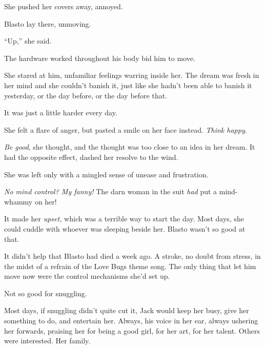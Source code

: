 She pushed her covers away, annoyed.



Blasto lay there, unmoving.



``Up,'' she said.



The hardware worked throughout his body bid him to move.



She stared at him, unfamiliar feelings warring inside her.  The dream was fresh in her mind and she couldn't banish it, just like she hadn't been able to banish it yesterday, or the day before, or the day before that.



It was just a little harder every day.



She felt a flare of anger, but pasted a smile on her face instead.  \emph{Think happy}.



\emph{Be good}, she thought, and the thought was too close to an idea in her dream.  It had the opposite effect, dashed her resolve to the wind.



She was left only with a mingled sense of unease and frustration.



\emph{No mind control?  My fanny!  }The darn woman in the suit \emph{had} put a mind-whammy on her!



It made her \emph{upset, }which was a terrible way to start the day.  Most days, she could cuddle with whoever was sleeping beside her.  Blasto wasn't so good at that.



It didn't help that Blasto had died a week ago.  A stroke, no doubt from stress, in the midst of a refrain of the Love Bugs theme song.  The only thing that let him move now were the control mechanisms she'd set up.



Not so good for snuggling.



Most days, if snuggling didn't quite cut it, Jack would keep her busy, give her something to do, and entertain her.  Always, his voice in her ear, always ushering her forwards, praising her for being a good girl, for her art, for her talent.  Others were interested.  Her family.



